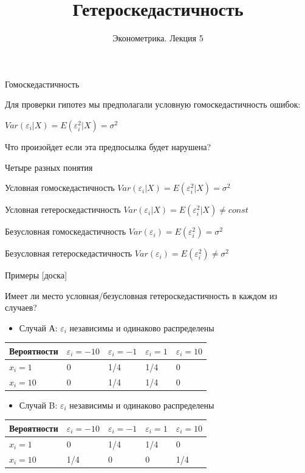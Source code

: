 \documentclass[ignorenonframetext,]{beamer}
\author[Эконометрика. Лекция 5]{Эконометрика. Лекция 5}
\title{Гетероскедастичность}
\date{}
\newcommand{\e}{\varepsilon}
\begin{document}
\frame{\titlepage}

\begin{frame}{Гомоскедастичность}

Для проверки гипотез мы предполагали условную гомоскедастичность ошибок:

\(Var(\varepsilon_i | X)=E(\varepsilon_i^2 | X)=\sigma^2\)

Что произойдет если эта предпосылка будет нарушена?

\end{frame}

\begin{frame}{Четыре разных понятия}

Условная гомоскедастичность
\(Var(\varepsilon_i | X)=E(\varepsilon_i^2 | X)=\sigma^2\)

Условная гетероскедастичность
\(Var(\varepsilon_i | X)=E(\varepsilon_i^2 | X) \neq const\)

Безусловная гомоскедастичность
\(Var(\varepsilon_i)=E(\varepsilon_i^2)=\sigma^2\)

Безусловная гетероскедастичность
\(Var(\varepsilon_i)=E(\varepsilon_i^2) \neq \sigma^2\)

\end{frame}

\begin{frame}{Примеры {[}доска{]}}

Имеет ли место условная/безусловная гетероскедастичность в каждом из
случаев?

\begin{itemize}
\itemsep1pt\parskip0pt
\item
  Случай А: \(\e_i\) независимы и одинаково распределены
\end{itemize}

\begin{longtable}[c]{@{}lllll@{}}
\toprule
Вероятности & \(\e_i=-10\) & \(\e_i=-1\) & \(\e_i=1\) &
\(\e_i=10\)\tabularnewline
\midrule
\endhead
\(x_i=1\) & 0 & 1/4 & 1/4 & 0\tabularnewline
\(x_i=10\) & 0 & 1/4 & 1/4 & 0\tabularnewline
\bottomrule
\end{longtable}

\begin{itemize}
\itemsep1pt\parskip0pt
\item
  Случай B: \(\e_i\) независимы и одинаково распределены
\end{itemize}

\begin{longtable}[c]{@{}lllll@{}}
\toprule
Вероятности & \(\e_i=-10\) & \(\e_i=-1\) & \(\e_i=1\) &
\(\e_i=10\)\tabularnewline
\midrule
\endhead
\(x_i=1\) & 0 & 1/4 & 1/4 & 0\tabularnewline
\(x_i=10\) & 1/4 & 0 & 0 & 1/4\tabularnewline
\bottomrule
\end{longtable}

\end{frame}
\end{document}
